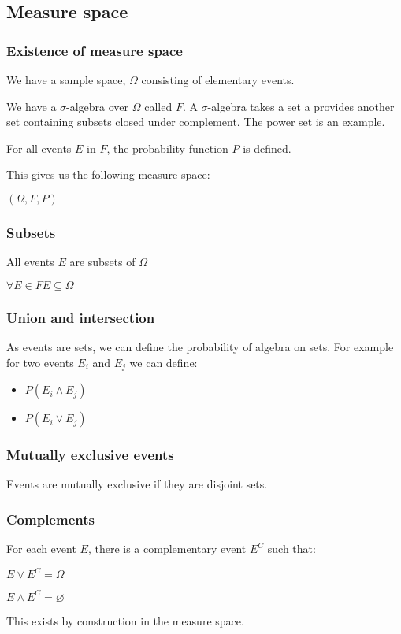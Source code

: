 
\subsection{Measure space}

\subsubsection{Existence of measure space}

We have a sample space, \(\Omega \) consisting of elementary events.

We have a \(\sigma\)-algebra over \(\Omega \) called \(F\). A \(\sigma\)-algebra takes a set a provides another set containing subsets closed under complement. The power set is an example.

For all events \(E\) in \(F\), the probability function \(P\) is defined.

This gives us the following measure space:

$(\Omega, F, P)$

\subsubsection{Subsets}

All events \(E\) are subsets of \(\Omega\)

\(\forall E\in F E\subseteq \Omega\)

\subsubsection{Union and intersection}

As events are sets, we can define the probability of algebra on sets. For example for two events \(E_i\) and \(E_j\) we can define:

\begin{itemize}
\item \(P(E_i\land E_j)\)
\item \(P(E_i\lor E_j)\)
\end{itemize}

\subsubsection{Mutually exclusive events}

Events are mutually exclusive if they are disjoint sets.

\subsubsection{Complements}

For each event \(E\), there is a complementary event \(E^C\) such that:

$E\lor E^C=\Omega$

$E\land E^C=\varnothing$

This exists by construction in the measure space.

